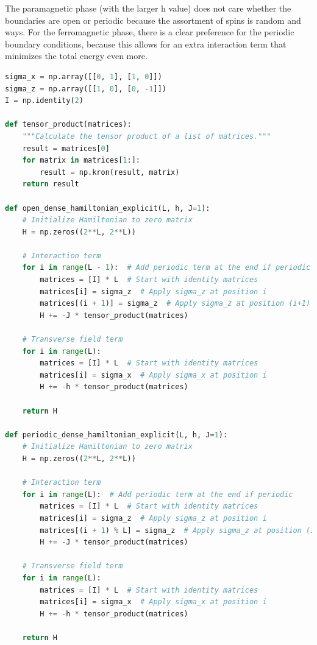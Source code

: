 \documentclass[12pt]{article}
\begin{document}
The paramagnetic phase (with the larger h value) does not care whether the boundaries are open or periodic because the assortment of spins is random and ways. For the ferromagnetic phase, there is a clear preference for the periodic boundary conditions, because this allows for an extra interaction term that minimizes the total energy even more.

\begin{lstlisting}[language=Python]
sigma_x = np.array([[0, 1], [1, 0]])
sigma_z = np.array([[1, 0], [0, -1]])
I = np.identity(2)

def tensor_product(matrices):
    """Calculate the tensor product of a list of matrices."""
    result = matrices[0]
    for matrix in matrices[1:]:
        result = np.kron(result, matrix)
    return result

def open_dense_hamiltonian_explicit(L, h, J=1):
    # Initialize Hamiltonian to zero matrix
    H = np.zeros((2**L, 2**L))
    
    # Interaction term
    for i in range(L - 1):  # Add periodic term at the end if periodic
        matrices = [I] * L  # Start with identity matrices
        matrices[i] = sigma_z  # Apply sigma_z at position i
        matrices[(i + 1)] = sigma_z  # Apply sigma_z at position (i+1) modulo L for periodic
        H += -J * tensor_product(matrices)
    
    # Transverse field term
    for i in range(L):
        matrices = [I] * L  # Start with identity matrices
        matrices[i] = sigma_x  # Apply sigma_x at position i
        H += -h * tensor_product(matrices)
    
    return H

def periodic_dense_hamiltonian_explicit(L, h, J=1):
    # Initialize Hamiltonian to zero matrix
    H = np.zeros((2**L, 2**L))
    
    # Interaction term
    for i in range(L):  # Add periodic term at the end if periodic
        matrices = [I] * L  # Start with identity matrices
        matrices[i] = sigma_z  # Apply sigma_z at position i
        matrices[(i + 1) % L] = sigma_z  # Apply sigma_z at position (i+1) modulo L for periodic
        H += -J * tensor_product(matrices)
    
    # Transverse field term
    for i in range(L):
        matrices = [I] * L  # Start with identity matrices
        matrices[i] = sigma_x  # Apply sigma_x at position i
        H += -h * tensor_product(matrices)
    
    return H


\end{lstlisting}
\end{document}
